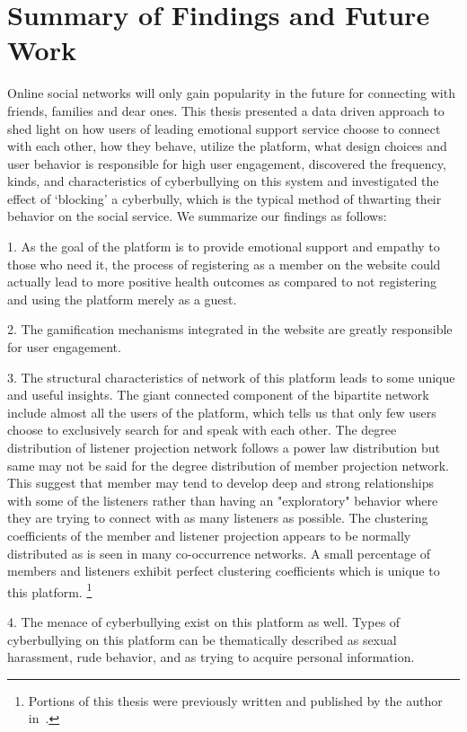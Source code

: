 \chapter{Summary of Findings and Future Work}

Online social networks will only gain popularity in the future for connecting with friends, families and dear ones. This thesis presented a data driven approach to shed light on how users of leading emotional support service choose to connect with each other, how they behave, utilize the platform, what design choices and user behavior is responsible for high user engagement, discovered the frequency, kinds, and characteristics of cyberbullying on this system and investigated the effect of ‘blocking’ a cyberbully, which is the typical method of thwarting their behavior on the social service. We summarize our findings as follows:

1. As the goal of the platform is to provide emotional support and empathy to those who need it, the process of registering as a member on the website could actually lead to more positive health outcomes as compared to not registering and using the platform merely as a guest.

2. The gamification mechanisms integrated in the website are greatly responsible for user engagement. 

3. The structural characteristics of network of this platform leads to some unique and useful insights. The giant connected component of the bipartite network include almost all the users of the platform, which tells us that only few users choose to exclusively search for and speak with each other. The degree distribution of listener projection network follows a power law distribution but same may not be said for the degree distribution of member projection network. This suggest that member may tend to develop deep and strong relationships with some of the listeners rather than having an "exploratory" behavior where they are trying to connect with as many listeners as possible. The clustering coefficients of the member and listener projection appears to be normally distributed as is seen in many co-occurrence networks. A small percentage of members and listeners exhibit perfect clustering coefficients which is unique to this platform.
\footnote{Portions of this thesis were previously written and published by the author in~\cite{doran2015stay}.}

4. The menace of cyberbullying exist on this platform as well. Types of cyberbullying on this platform can be thematically described as sexual harassment, rude behavior, and as trying to acquire personal information.

